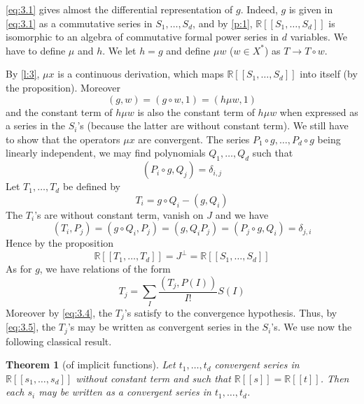 \documentclass[a4paper,12pt]{article}
\newtheorem*{theorem*}{Theorem}
\newcommand{\R}{\mathbb{R}}
\begin{document}
\eqref{eq:3.1} gives almost the differential representation of $g$. Indeed, $g$ is given in \eqref{eq:3.1} as a commutative series in $S_1, \ldots, S_d$, and by \cref{p:1}, $\R \left[\left[{S}_1, \ldots, {S}_{{d}}\right]\right]$ is isomorphic to an algebra of commutative formal power series in $d$ variables. We have to define $\mu$ and $h$. 
We let ${h}={g}$ and define $\mu w$ ($w \in {X}^*$) as ${T} \rightarrow {T} \circ {w}$.

By \cref{l:3}, $\mu {x}$ is a continuous derivation, which maps $\R[[S_1,\dotsc,S_d]]$ into itself (by the proposition). Moreover
\begin{equation*}
	({g}, {w})=({g} \circ {w}, 1)=({h} \mu {w}, 1)
\end{equation*}
and the constant term of ${h} \mu w$ is also the constant term of ${h} \mu {{w}}$ when expressed as a series in the ${S}_i$'s (because the latter are without constant term).
We still have to show that the operators $\mu {x}$ are convergent. The series $P_1 \circ {g}, \ldots, P_d \circ {g}$ being linearly independent, we may find polynomials $Q_1, \ldots, Q_d$ such that
\begin{equation*}
	\left(P_i \circ g, Q_j\right)=\delta_{i, j}
\end{equation*}
Let ${T}_1, \ldots, {T}_{{d}}$ be defined by
\begin{equation*} \label{eq:3.4} \tag{4}
	T_i=g \circ Q_i-\left(g, Q_i\right)
\end{equation*}
The $T_i$'s are without constant term, vanish on $J$ and we have
\begin{equation*}
	\left(T_i, P_j\right)=\left(g \circ Q_i, P_j\right)=\left(g, Q_i P_j\right)=\left(P_j \circ g, Q_i\right)=\delta_{j, i}
\end{equation*}
Hence by the proposition
\begin{equation*}
	\R\left[\left[{T}_1, \ldots, {T}_{{d}}\right]\right]={J}^{\perp}=\R\left[\left[{S}_1, \ldots, {S}_{{d}}\right]\right]
\end{equation*}
As for $g$, we have relations of the form
\begin{equation*} \label{eq:3.5} \tag{5}
	T_j=\sum_I \frac{\left(T_j, P(I)\right)}{I !} S(I)
\end{equation*}
Moreover by \eqref{eq:3.4}, the ${T}_{{j}}$'s satisfy to the convergence hypothesis. Thus, by \eqref{eq:3.5}, the $T_j$'s may be written as convergent series in the $S_i$'s. We use now the following classical result.

\begin{theorem*}[of implicit functions]
	Let $t_1, \ldots, t_d$ convergent series in $\R\left[\left[s_1, \ldots, s_d\right]\right]$ without constant term and such that $\R[[s]]=\R[[t]]$. Then each $s_i$ may be written as a convergent series in $t_1, \ldots, t_d$.
\end{theorem*}
\end{document}

